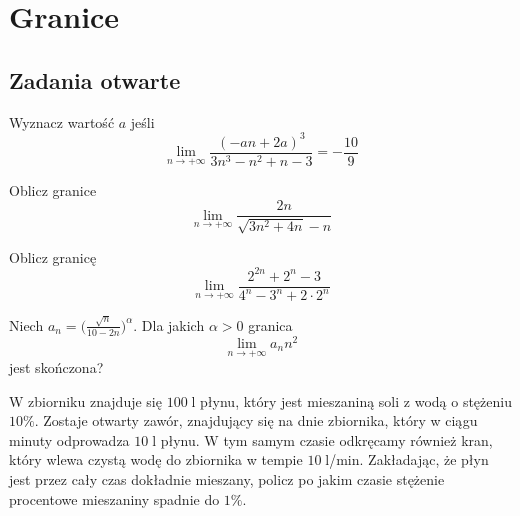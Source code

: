 \setcounter{parc}{0}
\addtocounter{chapc}{1}

\chapter{Granice}

\section{Zadania otwarte}

\zadanie Wyznacz wartość $a$ jeśli \[ \lim_{n \to +\infty} \dfrac{(-an + 2a)^3}{3n^3 - n^2 + n - 3} = - \dfrac{10}{9} \]

\zadanie Oblicz granice \[ \lim_{n \to +\infty} \dfrac{2n}{\sqrt{3n^2 + 4n} - n} \]

\zadanie Oblicz granicę \[ \lim_{n \to +\infty} \dfrac{2^{2n} + 2^n - 3}{4^n - 3^n + 2\cdot 2^n} \]

\zadanie Niech $a_n = \big(\frac{\sqrt{n}}{10 - 2n}\big)^\alpha$. Dla jakich $\alpha > 0$ granica \[ \lim_{n \to +\infty} a_nn^2 \] jest skończona?

\zadanie W zbiorniku znajduje się $100\;$l płynu, który jest mieszaniną soli z wodą o stężeniu $10\%$. Zostaje otwarty zawór, znajdujący się na dnie zbiornika, który w ciągu minuty odprowadza $10\;$l płynu. W tym samym czasie odkręcamy również kran, który wlewa czystą wodę do zbiornika w tempie {$10\;$l/min.} Zakładając, że płyn jest przez cały czas dokładnie mieszany, policz po jakim czasie stężenie procentowe mieszaniny spadnie do $1\%$. %